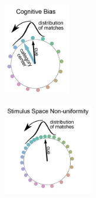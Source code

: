 \begin{figure}
    \centering

    \begin{subfigure}[t]{0.3\textwidth}
         \centering
         \caption{}
       \includegraphics[height=4cm]{../Figures/working/F3_TCCModel/a.png}
         \label{fig:TCCCartoonA}
    \end{subfigure}
    \begin{subfigure}[t]{0.3\textwidth}
         \centering
         \caption{}
       \includegraphics[height=4cm]{../Figures/working/F3_TCCModel/b.png}
         \label{fig:TCCCartoonB}
    \end{subfigure}
    
    \begin{subfigure}[t]{0.3\textwidth}
         \centering
         \caption{}
        
         \label{fig:TCCModel_og}
    \end{subfigure}
    \begin{subfigure}[t]{0.3\textwidth}
         \centering
         \caption{}
         
         \label{fig:TCCModel_ssnu}
    \end{subfigure}


\end{figure}
